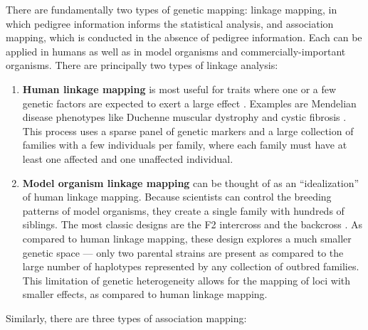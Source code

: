 There are fundamentally two types of genetic mapping: linkage mapping, in which pedigree information informs the statistical analysis, and association mapping, which is conducted in the absence of pedigree information.
Each can be applied in humans as well as in model organisms and commercially-important organisms.
There are principally two types of linkage analysis:
\begin{enumerate}
	\item \textbf{Human linkage mapping} is most useful for traits where one or a few genetic factors are expected to exert a large effect \citep{Botstein1980}.
	Examples are Mendelian disease phenotypes like Duchenne muscular dystrophy \citep{Brown1985,Murray1982} and cystic fibrosis \citep{Tsui1985,Wainwright1985,White1985}.
	This process uses a sparse panel of genetic markers and a large collection of families with a few individuals per family, where each family must have at least one affected and one unaffected individual.
	\item \textbf{Model organism linkage mapping} can be thought of as an ``idealization'' of human linkage mapping.
	Because scientists can control the breeding patterns of model organisms, they create a single family with hundreds of siblings.
	The most classic designs are the F2 intercross and the backcross \citep{Lynch1998,Lander1987,Lander1989a}.
	As compared to human linkage mapping, these design explores a much smaller genetic space --- only two parental strains are present as compared to the large number of haplotypes represented by any collection of outbred families.
	This limitation of genetic heterogeneity allows for the mapping of loci with smaller effects, as compared to human linkage mapping.
\end{enumerate}
Similarly, there are three types of association mapping:
